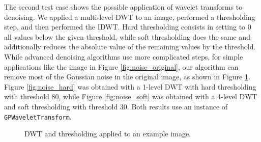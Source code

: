 The second test case shows the possible application of wavelet transforms to denoising. We applied a multi-level DWT to an image, performed a thresholding step, and then performed the IDWT. Hard thresholding consists in setting to 0 all values below the given threshold, while soft thresholding does the same and additionally reduces the absolute value of the remaining values by the threshold. While advanced denoising algorithms use more complicated steps, for simple applications like the image in Figure \ref{fig:noise_original}, our algorithm can remove most of the Gaussian noise in the original image, as shown in Figure \ref{fig:thresholding}. Figure \ref{fig:noise_hard} was obtained with a 1-level DWT with hard thresholding with threshold 80, while Figure \ref{fig:noise_soft} was obtained with a 4-level DWT and soft thresholding with threshold 30. Both results use an instance of \texttt{GP\-Wavelet\-Transform}. 

\begin{figure}[ht]
    \centering
    \caption{DWT and thresholding applied to an example image.}
    \label{fig:thresholding}
\end{figure}